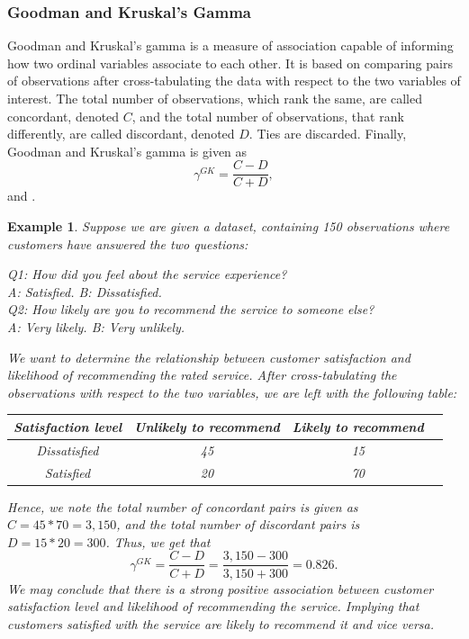 \documentclass[a4project,12pt]{article}
\theoremstyle{examplestyle}
\newtheorem{example}{Example}[section]
\theoremstyle{defstyle}
\theoremstyle{thmstyle}
\begin{document}
\subsubsection{Goodman and Kruskal's Gamma}
Goodman and Kruskal's gamma is a measure of association capable of informing how two ordinal variables associate to each other. It is based on comparing pairs of observations after cross-tabulating the data with respect to the two variables of interest. The total number of observations, which rank the same, are called concordant, denoted $C$, and the total number of observations, that rank differently, are called discordant, denoted $D$. Ties are discarded. Finally, Goodman and Kruskal's gamma is given as
\begin{equation}
    \gamma^{GK} = \frac{C-D}{C+D},
\end{equation}
\cite{davis-1967} and \cite{goodman-kruskal-1954}.
\begin{mybox3}
\begin{example}
Suppose we are given a dataset, containing 150 observations where customers have answered the two questions:


    \begin{centering}
        Q1: How did you feel about the service experience? \\
        A: Satisfied. \qquad B: Dissatisfied. \\
        Q2: How likely are you to recommend the service to someone else?\\
        A: Very likely. \qquad B: Very unlikely. \\ 
    \end{centering}
We want to determine the relationship between customer satisfaction and likelihood of recommending the rated service. After cross-tabulating the observations with respect to the two variables, we are left with the following table:
    \begin{table}[H]
        \centering
        \begin{tabular}{|c|c|c|c|}
             \hline 
             Satisfaction level & Unlikely to recommend & Likely to recommend  \\
             \hline 
             Dissatisfied & 45 &  15 \\
             \hline
             Satisfied & 20 & 70 \\
             \hline 
        \end{tabular}
        \label{tab:ex1}
    \end{table}
    Hence, we note the total number of concordant pairs is given as $C=45*70 = 3,150$, and the total number of discordant pairs is $D=15*20 = 300$. Thus, we get that 
    \begin{equation*}
        \gamma^{GK}=\frac{C-D}{C+D} = \frac{3,150-300}{3,150+300} = 0.826.
    \end{equation*}
    We may conclude that there is a strong positive association between customer satisfaction level and likelihood of recommending the service. Implying that customers satisfied with the service are likely to recommend it and vice versa.
\end{example}    
\end{mybox3}
\end{document}
